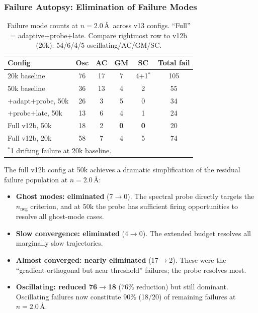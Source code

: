 \documentclass[11pt,a4paper]{article}
\theoremstyle{definition}
\begin{document}
\subsubsection{Failure Autopsy: Elimination of Failure Modes}
\label{sec:v13-autopsy}

\begin{table}[h]
\centering
\caption{Failure mode counts at $n=2.0$\,\AA\ across v13 configs.  ``Full''
  = adaptive+probe+late.  Compare rightmost row to v12b (20k):
  54/6/4/5 oscillating/AC/GM/SC.}
\label{tab:v13-autopsy}
\begin{tabular}{lccccc}
\toprule
Config & Osc & AC & GM & SC & Total fail \\
\midrule
20k baseline            & 76 & 17 & 7 & 4$+$1$^*$ & 105 \\
50k baseline            & 36 & 13 & 4 & 2 & 55 \\
$+$adapt$+$probe, 50k  & 26 & 3  & 5 & 0 & 34 \\
$+$probe$+$late, 50k   & 13 & 6  & 4 & 1 & 24 \\
Full v12b, 50k          & 18 & 2  & \textbf{0} & \textbf{0} & 20 \\
Full v12b, 20k          & 58 & 7  & 4 & 5 & 74 \\
\bottomrule
\multicolumn{6}{l}{\footnotesize $^*$1 drifting failure at 20k baseline.} \\
\end{tabular}
\end{table}

The full v12b config at 50k achieves a dramatic simplification of the
residual failure population at $n=2.0$\,\AA:

\begin{itemize}[nosep]
  \item \textbf{Ghost modes: eliminated} (7$\to$0).  The spectral probe
    directly targets the $n_\text{neg}$ criterion, and at 50k the probe
    has sufficient firing opportunities to resolve all ghost-mode cases.
  \item \textbf{Slow convergence: eliminated} (4$\to$0).  The extended
    budget resolves all marginally slow trajectories.
  \item \textbf{Almost converged: nearly eliminated} (17$\to$2).  These
    were the ``gradient-orthogonal but near threshold'' failures;
    the probe resolves most.
  \item \textbf{Oscillating: reduced 76$\to$18} (76\% reduction) but
    still dominant.  Oscillating failures now constitute 90\% (18/20) of
    remaining failures at $n=2.0$\,\AA.
\end{itemize}
\end{document}

